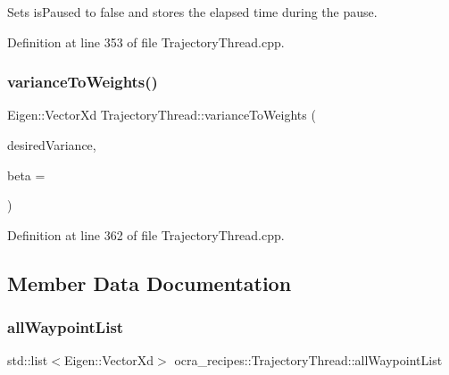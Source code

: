Sets is\+Paused to false and stores the elapsed time during the pause. 

Definition at line 353 of file Trajectory\+Thread.\+cpp.

\hypertarget{classocra__recipes_1_1TrajectoryThread_a80547ba585263055ad226a386ef18313}{}\label{classocra__recipes_1_1TrajectoryThread_a80547ba585263055ad226a386ef18313} 
\subsubsection{\texorpdfstring{variance\+To\+Weights()}{varianceToWeights()}}
{\footnotesize\ttfamily Eigen\+::\+Vector\+Xd Trajectory\+Thread\+::variance\+To\+Weights (\begin{DoxyParamCaption}\item[{Eigen\+::\+Vector\+Xd \&}]{desired\+Variance,  }\item[{const double}]{beta = {} }\end{DoxyParamCaption})\hspace{0.3cm}{\ttfamily [protected]}}



Definition at line 362 of file Trajectory\+Thread.\+cpp.



\subsection{Member Data Documentation}
\hypertarget{classocra__recipes_1_1TrajectoryThread_a21821862b17ba40b639c35125611f9d4}{}\label{classocra__recipes_1_1TrajectoryThread_a21821862b17ba40b639c35125611f9d4} 
\subsubsection{\texorpdfstring{all\+Waypoint\+List}{allWaypointList}}
{\footnotesize\ttfamily std\+::list$<$Eigen\+::\+Vector\+Xd$>$ ocra\+\_\+recipes\+::\+Trajectory\+Thread\+::all\+Waypoint\+List\hspace{0.3cm}{\ttfamily [protected]}}



